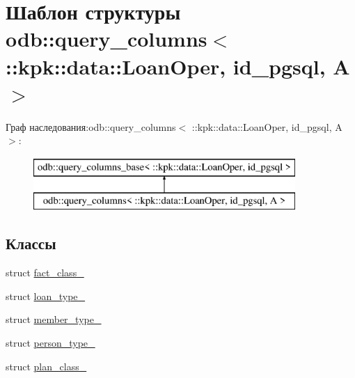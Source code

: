 \hypertarget{structodb_1_1query__columns_3_01_1_1kpk_1_1data_1_1_loan_oper_00_01id__pgsql_00_01_a_01_4}{}\section{Шаблон структуры odb\+:\+:query\+\_\+columns$<$ \+:\+:kpk\+:\+:data\+:\+:Loan\+Oper, id\+\_\+pgsql, A $>$}
\label{structodb_1_1query__columns_3_01_1_1kpk_1_1data_1_1_loan_oper_00_01id__pgsql_00_01_a_01_4}
Граф наследования\+:odb\+:\+:query\+\_\+columns$<$ \+:\+:kpk\+:\+:data\+:\+:Loan\+Oper, id\+\_\+pgsql, A $>$\+:\begin{figure}[H]
\begin{center}
\leavevmode
\includegraphics[height=2.000000cm]{structodb_1_1query__columns_3_01_1_1kpk_1_1data_1_1_loan_oper_00_01id__pgsql_00_01_a_01_4}
\end{center}
\end{figure}
\subsection*{Классы}
\begin{DoxyCompactItemize}
\item 
struct \hyperlink{structodb_1_1query__columns_3_01_1_1kpk_1_1data_1_1_loan_oper_00_01id__pgsql_00_01_a_01_4_1_1fact__class__}{fact\+\_\+class\+\_\+}
\item 
struct \hyperlink{structodb_1_1query__columns_3_01_1_1kpk_1_1data_1_1_loan_oper_00_01id__pgsql_00_01_a_01_4_1_1loan__type__}{loan\+\_\+type\+\_\+}
\item 
struct \hyperlink{structodb_1_1query__columns_3_01_1_1kpk_1_1data_1_1_loan_oper_00_01id__pgsql_00_01_a_01_4_1_1member__type__}{member\+\_\+type\+\_\+}
\item 
struct \hyperlink{structodb_1_1query__columns_3_01_1_1kpk_1_1data_1_1_loan_oper_00_01id__pgsql_00_01_a_01_4_1_1person__type__}{person\+\_\+type\+\_\+}
\item 
struct \hyperlink{structodb_1_1query__columns_3_01_1_1kpk_1_1data_1_1_loan_oper_00_01id__pgsql_00_01_a_01_4_1_1plan__class__}{plan\+\_\+class\+\_\+}
\end{DoxyCompactItemize}

